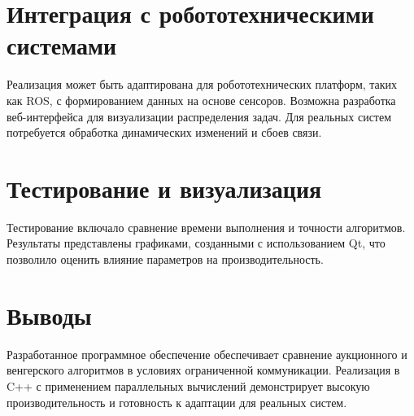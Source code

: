 \section{Интеграция с робототехническими системами}

Реализация может быть адаптирована для робототехнических платформ, таких как ROS, с формированием данных на основе сенсоров. Возможна разработка веб-интерфейса для визуализации распределения задач. Для реальных систем потребуется обработка динамических изменений и сбоев связи.

\section{Тестирование и визуализация}

Тестирование включало сравнение времени выполнения и точности алгоритмов. Результаты представлены графиками, созданными с использованием Qt, что позволило оценить влияние параметров на производительность.

\section{Выводы}

Разработанное программное обеспечение обеспечивает сравнение аукционного и венгерского алгоритмов в условиях ограниченной коммуникации. Реализация в C++ с применением параллельных вычислений демонстрирует высокую производительность и готовность к адаптации для реальных систем.